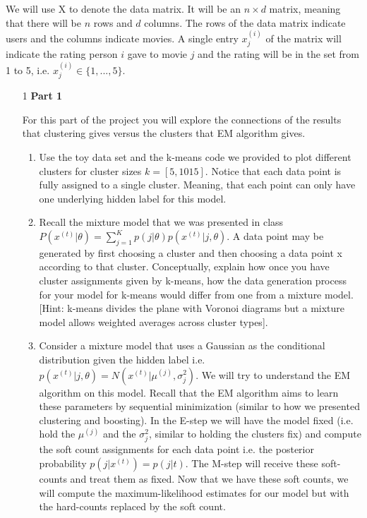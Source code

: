 We will use X to denote the data matrix. It will be an $n \times d$ matrix, meaning that there will be $n$ rows and $d$ columns. The rows of the data matrix indicate users and the columns indicate movies. A single entry $x^{(i)}_{j}$ of the matrix will indicate the rating person $i$ gave to movie $j$ and the rating will be in the set from 1 to 5, i.e. $x^{(i)}_{j} \in \{ 1, ..., 5\}$.
\begin{enumerate}

\item[1] {\bf Part 1}

For this part of the project you will explore the connections of the results that clustering gives versus the clusters that EM algorithm gives.

\begin{enumerate}
  \item Use the toy data set and the k-means code we provided to plot different clusters for cluster sizes $k = [5, 10 15]$. Notice that each data point is fully assigned to a single cluster. Meaning, that each point can only have one underlying hidden label for this model.
  \item Recall the mixture model that we was presented in class $P(x^{(t)} | \theta) = \sum^{K}_{j=1} p(j| \theta)p(x^{(t)} | j, \theta) $. A data point may be generated by first choosing a cluster and then choosing a data point x according to that cluster. Conceptually, explain how once you have cluster assignments given by k-means, how the data generation process for your model for k-means would differ from one from a mixture model. [Hint: k-means divides the plane with Voronoi diagrams but a mixture model allows weighted averages across cluster types].
  \item Consider a mixture model that uses a Gaussian as the conditional distribution given the hidden label i.e. $p(x^{(t)} | j, \theta) = N(x^{(t)}| \mu^{(j)}, \sigma^2_{j})$.  We will try to understand the EM algorithm on this model. 
 Recall that the EM algorithm aims to learn these parameters by sequential minimization (similar to how we presented clustering and boosting). 
In the E-step we will have the model fixed (i.e. hold the $ \mu^{(j)}$ and the $\sigma^2_{j}$, similar to holding the clusters fix) and compute the soft count assignments for each data point i.e. the posterior probability $p(j | x^{(t)}) = p(j|t)$. The M-step will receive these soft-counts and treat them as fixed. Now that we have these soft counts, we will compute the maximum-likelihood estimates for our model but with the hard-counts replaced by the soft count. 
\end{enumerate}

\end{enumerate}






